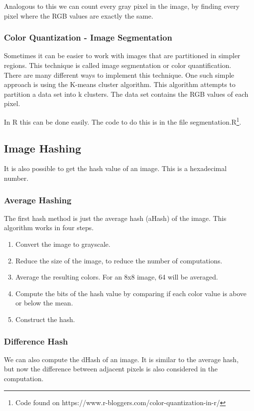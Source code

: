 \documentclass[12pt]{article}
\begin{document}
Analogous to this we can count every gray pixel in the image, by finding every pixel where the RGB values are exactly the same.

\subsubsection{Color Quantization - Image Segmentation}

Sometimes it can be easier to work with images that are partitioned in simpler regions. This technique is called image segmentation or color quantification. There are many different ways to implement this technique. One such simple approach is using the K-means cluster algorithm. This algorithm attempts to partition a data set into k clusters. The data set contains the RGB values of each pixel.
\newline

In R this can be done easily. The code to do this is in the file segmentation.R\footnote{Code found on https://www.r-bloggers.com/color-quantization-in-r/}.

\subsection{Image Hashing}
It is also possible to get the hash value of an image. This is a hexadecimal number.

\subsubsection{Average Hashing}
The first hash method is just the average hash (aHash) of the image. This algorithm works in four steps.

\begin{enumerate}
        \item Convert the image to grayscale. 
        \item Reduce the size of the image, to reduce the number of computations.
        \item Average the resulting colors. For an 8x8 image, 64 will be averaged.
        \item Compute the bits of the hash value by comparing if each color value is above or below the mean.
        \item Construct the hash.
\end{enumerate}

\subsubsection{Difference Hash}
We can also compute the dHash of an image. It is similar to the average hash, but now the difference between adjacent pixels is also considered in the computation.
\end{document}
